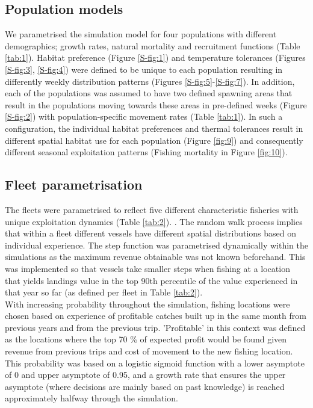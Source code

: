 \documentclass[review]{elsarticle}
\begin{document}
\subsection{Population models}

We parametrised the simulation model for four populations with different
demographics; growth rates, natural mortality and recruitment functions (Table
\ref{tab:1}). Habitat preference (Figure \ref{S-fig:1}) and temperature
tolerances (Figures \ref{S-fig:3}, \ref{S-fig:4}) were defined to be unique to
each population resulting in differently weekly distribution patterns (Figures
\ref{S-fig:5}-\ref{S-fig:7}). In addition, each of the populations was assumed
to have two defined spawning areas that result in the populations moving
towards these areas in pre-defined weeks (Figure \ref{S-fig:2}) with
population-specific movement rates (Table \ref{tab:1}). In such a
configuration, the individual habitat preferences and thermal tolerances result
in different spatial habitat use for each population (Figure \ref{fig:9}) and
consequently different seasonal exploitation patterns (Fishing mortality in
Figure \ref{fig:10}). 

\subsection{Fleet parametrisation}

The fleets were parametrised to reflect five different characteristic fisheries
with unique exploitation dynamics (Table \ref{tab:2}).  .  The
random walk process implies that within a fleet different vessels have
different spatial distributions based on individual experience. The step
function was parametrised dynamically within the simulations as the maximum
revenue obtainable was not known beforehand. This was implemented so that
vessels take smaller steps when fishing at a location that yields landings
value in the top 90th percentile of the value experienced in that year so far
(as defined per fleet in Table \ref{tab:2}). \\

With increasing probability throughout the simulation, fishing locations were
chosen based on experience of profitable catches built up in the same month
from previous years and from the previous trip. 'Profitable' in this context
was defined as the locations where the top 70 \% of expected profit would be
found given revenue from previous trips and cost of movement to the new fishing
location. This probability was based on a logistic sigmoid function with a
lower asymptote of 0 and upper asymptote of 0.95, and a growth rate that
ensures the upper asymptote (where decisions are mainly based on past
knowledge) is reached approximately halfway through the simulation.  \\
\end{document}
